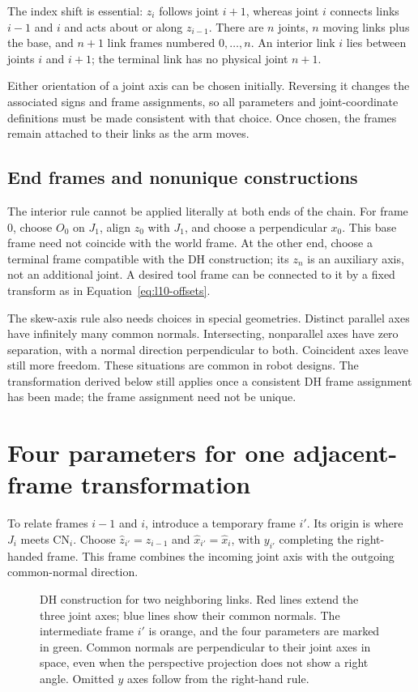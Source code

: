 The index shift is essential: $z_i$ follows joint $i+1$, whereas joint $i$
connects links $i-1$ and $i$ and acts about or along $z_{i-1}$. There are
$n$ joints, $n$ moving links plus the base, and $n+1$ link frames numbered
$0,\ldots,n$. An interior link $i$ lies between joints $i$ and $i+1$;
the terminal link has no physical joint $n+1$.

Either orientation of a joint axis can be chosen initially. Reversing it
changes the associated signs and frame assignments, so all parameters and
joint-coordinate definitions must be made consistent with that choice.
Once chosen, the frames remain attached to their links as the arm moves.

\subsection{End frames and nonunique constructions}
The interior rule cannot be applied literally at both ends of the chain.
For frame 0, choose $O_0$ on $J_1$, align $z_0$ with $J_1$, and choose a
perpendicular $x_0$. This base frame need not coincide with the world frame.
At the other end, choose a terminal frame compatible with the DH
construction; its $z_n$ is an auxiliary axis, not an additional joint.
A desired tool frame can be connected to it by a fixed transform as in
Equation~\eqref{eq:l10-offsets}.

The skew-axis rule also needs choices in special geometries. Distinct
parallel axes have infinitely many common normals. Intersecting,
nonparallel axes have zero separation, with a normal direction
perpendicular to both. Coincident axes leave still more freedom.
These situations are common in robot designs. The transformation derived
below still applies once a consistent DH frame assignment has been made;
the frame assignment need not be unique.

\section{Four parameters for one adjacent-frame transformation}
\label{sec:l10-dh-parameters}
To relate frames $i-1$ and $i$, introduce a temporary frame $i'$.
Its origin is where $J_i$ meets $\mathrm{CN}_i$. Choose
$\hat z_{i'}=\hat z_{i-1}$ and $\hat x_{i'}=\hat x_i$, with $y_{i'}$
completing the right-handed frame. This frame combines the incoming joint
axis with the outgoing common-normal direction.

\begin{figure}[htbp]
\centering
\caption{DH construction for two neighboring links. Red lines extend the
three joint axes; blue lines show their common normals. The intermediate
frame $i'$ is orange, and the four parameters are marked in green.
Common normals are perpendicular to their joint axes in space, even when
the perspective projection does not show a right angle. Omitted $y$ axes
follow from the right-hand rule.}
\label{fig:l10-dh-geometry}
\end{figure}

